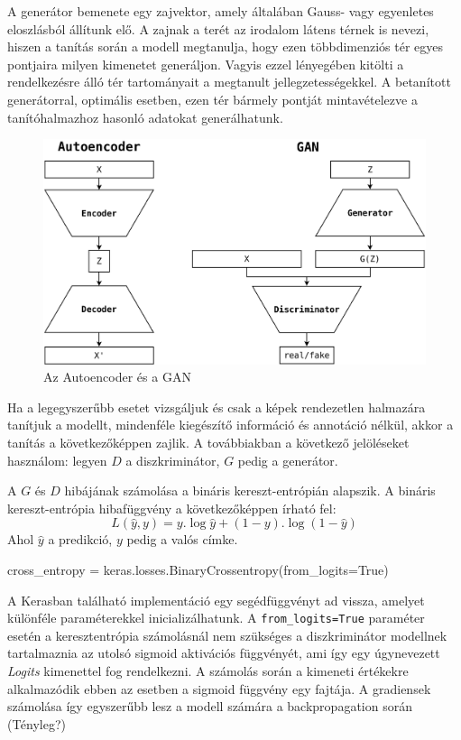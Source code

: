 A generátor bemenete egy zajvektor, amely általában Gauss- vagy egyenletes eloszlásból állítunk elő. A zajnak a terét az irodalom látens térnek is nevezi, hiszen a tanítás során a modell megtanulja, hogy ezen többdimenziós tér egyes pontjaira milyen kimenetet generáljon. Vagyis ezzel lényegében kitölti a rendelkezésre álló tér tartományait a megtanult jellegzetességekkel. A betanított generátorral, optimális esetben, ezen tér bármely pontját mintavételezve a tanítóhalmazhoz hasonló adatokat generálhatunk.

\begin{figure}[h]
\centering
\includegraphics[width=12cm]{images/AEvsGAN.png}
\caption{Az Autoencoder és a GAN}
\label{fig:aevsgan}
\end{figure}


Ha a legegyszerűbb esetet vizsgáljuk és csak a képek rendezetlen halmazára tanítjuk a modellt, mindenféle kiegészítő információ és annotáció nélkül, akkor a tanítás a következőképpen zajlik.
A továbbiakban a következő jelöléseket használom: legyen $D$ a diszkriminátor, $G$ pedig a generátor.


A $G$ és $D$ hibájának számolása a bináris kereszt-entrópián alapszik.
A bináris kereszt-entrópia hibafüggvény a következőképpen írható fel:
$$L(\hat y, y) = y . \log \hat y + (1-y). \log (1 - \hat y)$$
Ahol $\hat y$ a predikció, $y$ pedig a valós címke.

\begin{python}
cross_entropy = keras.losses.BinaryCrossentropy(from_logits=True)
\end{python}

A Kerasban található implementáció egy segédfüggvényt ad vissza, amelyet különféle paraméterekkel inicializálhatunk. A \texttt{from\_logits=True} paraméter esetén a keresztentrópia számolásnál nem szükséges a diszkriminátor modellnek tartalmaznia az utolsó sigmoid aktivációs függvényét, ami így egy úgynevezett \textit{Logits} kimenettel fog rendelkezni. A számolás során a kimeneti értékekre alkalmazódik ebben az esetben a sigmoid függvény egy fajtája. A gradiensek számolása így egyszerűbb lesz a modell számára a backpropagation során (Tényleg?)

